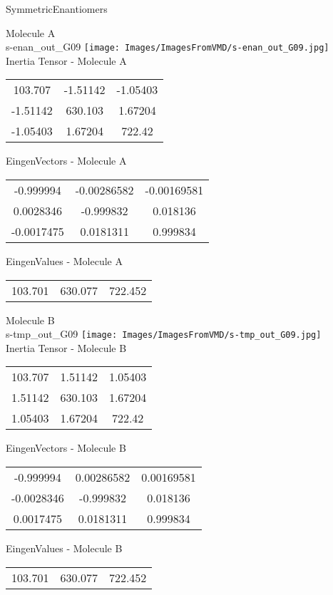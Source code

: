 \vtab[-2cm]
\begin{center}
{\large SymmetricEnantiomers}
\end{center}
\begin{multicols}{2}
\begin{center}
Molecule A \\ 
s-enan\_out\_G09
\texttt{[image: Images/ImagesFromVMD/s-enan\_out\_G09.jpg]}
\\
Inertia Tensor - Molecule A \\
\vtab
\begin{tabular}{|c c c|}
103.707	 & 	-1.51142	 & 	-1.05403	 \\
-1.51142	 & 	630.103	 & 	1.67204	 \\
-1.05403	 & 	1.67204	 & 	722.42
\end{tabular}

\vtab
 EingenVectors - Molecule A     \\
\vtab
\begin{tabular}{|c c c|}
-0.999994	 & 	-0.00286582	 & 	-0.00169581	 \\
0.0028346	 & 	-0.999832	 & 	0.018136	 \\
-0.0017475	 & 	0.0181311	 & 	0.999834
\end{tabular}

\vtab
 EingenValues - Molecule A     \\
\vtab
\begin{tabular}{|c c c|}
103.701	 & 	630.077	 & 	722.452
\end{tabular}
\columnbreak

Molecule B \\ 
s-tmp\_out\_G09
\texttt{[image: Images/ImagesFromVMD/s-tmp\_out\_G09.jpg]}
\\
Inertia Tensor - Molecule B \\
\vtab
\begin{tabular}{|c c c|}
103.707	 & 	1.51142	 & 	1.05403	 \\
1.51142	 & 	630.103	 & 	1.67204	 \\
1.05403	 & 	1.67204	 & 	722.42
\end{tabular}

\vtab
 EingenVectors - Molecule B     \\
\vtab
\begin{tabular}{|c c c|}
-0.999994	 & 	0.00286582	 & 	0.00169581	 \\
-0.0028346	 & 	-0.999832	 & 	0.018136	 \\
0.0017475	 & 	0.0181311	 & 	0.999834
\end{tabular}

\vtab
 EingenValues - Molecule B     \\
\vtab
\begin{tabular}{|c c c|}
103.701	 & 	630.077	 & 	722.452
\end{tabular}

\end{center}
\end{multicols}
